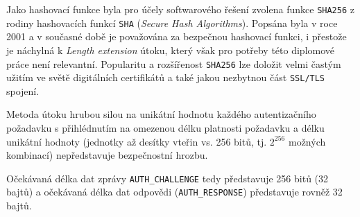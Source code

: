 \documentclass[thesis=M,czech]{FITthesis}[2012/10/20]
\begin{document}
Jako hashovací funkce byla pro účely softwarového řešení zvolena funkce \texttt{SHA256} z rodiny hashovacích funkcí \texttt{SHA} (\textit{Secure Hash Algorithms}). Popsána byla v roce 2001 a v současné době je považována za bezpečnou hashovací funkci, i přestože je náchylná k \textit{Length extension} útoku, který však pro potřeby této diplomové práce není relevantní. Popularitu a rozšířenost \texttt{SHA256} lze doložit velmi častým užitím ve světě digitálních certifikátů a také jakou nezbytnou část \texttt{SSL/TLS} spojení.

Metoda útoku hrubou silou na unikátní hodnotu každého autentizačního požadavku s přihlédnutím na omezenou délku platnosti požadavku a délku unikátní hodnoty (jednotky až desítky vteřin vs. 256 bitů, tj. $2^{256}$ možných kombinací) nepředstavuje bezpečnostní hrozbu.

Očekávaná délka dat zprávy \texttt{AUTH\_CHALLENGE} tedy představuje 256 bitů (32 bajtů) a očekávaná délka dat odpovědi (\texttt{AUTH\_RESPONSE}) představuje rovněž 32 bajtů.
\end{document}
